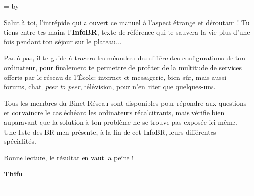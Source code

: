 \newskip\oldpar
\oldpar=\parskip
\advance\parskip by \baselineskip

\indent
Salut \`a toi, l'intr\'epide qui a ouvert ce manuel \`a l'aspect \'etrange et d\'eroutant ! Tu tiens entre tes mains l'\textbf{InfoBR}, texte de r\'ef\'erence qui te sauvera la vie plus d'une fois pendant ton s\'ejour sur le plateau...

Pas \`a pas, il te guide \`a travers les m\'eandres des diff\'erentes configurations de ton ordinateur, pour finalement te permettre de profiter de la multitude de services offerts par le r\'eseau de l'\'Ecole: internet et messagerie, bien s\^{u}r, mais aussi forums, chat, \emph{peer to peer}, t\'el\'evision, pour n'en citer que quelques-uns.

Tous les membres du Binet R\'eseau sont disponibles pour r\'epondre aux questions et convaincre le cas \'ech\'eant les ordinateurs r\'ecalcitrants, mais v\'erifie bien auparavant que la solution \`a ton probl\`eme ne se trouve pas expos\'ee ici-m\^{e}me. Une liste des \hbox{BR-men} pr\'esente, \`a la fin de cet InfoBR, leurs diff\'erentes sp\'ecialit\'es.

Bonne lecture, le r\'esultat en vaut la peine !

\begin{flushright}
\textbf{Thifu}
\end{flushright}

\parskip=\oldpar
